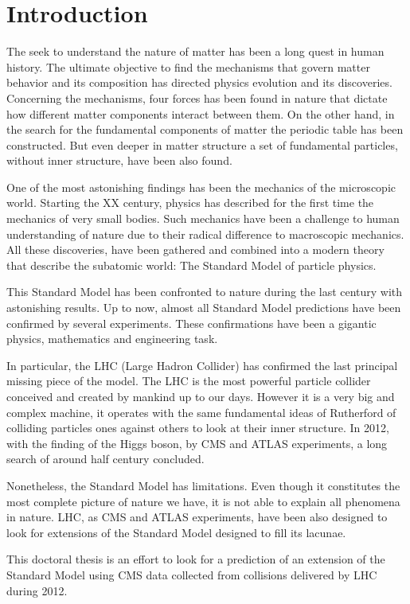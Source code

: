 \chapter*{Introduction}

The seek to understand the nature of matter has been a long quest in human history. The ultimate objective to find the mechanisms that govern matter behavior and its composition has directed physics evolution and its discoveries. Concerning the mechanisms, four forces has been found in nature that dictate how different matter components interact between them. On the other hand, in the search for the fundamental components of matter the periodic table has been constructed. But even deeper in matter structure a set of fundamental particles, without inner structure, have been also found. 

One of the most astonishing findings has been the mechanics of the microscopic world. Starting the XX century, physics has described for the first time the mechanics of very small bodies. Such mechanics have been a challenge to human understanding of nature due to their radical difference to macroscopic mechanics. All these discoveries, have been gathered and combined into a modern theory that describe the subatomic world: The Standard Model of particle physics. 

This Standard Model has been confronted to nature during the last century with astonishing results. Up to now, almost all Standard Model predictions have been confirmed by several experiments. These confirmations have been a gigantic physics, mathematics and engineering task.

In particular, the LHC (Large Hadron Collider) has confirmed the last principal missing piece of the model. The LHC is the most powerful particle collider conceived and created by mankind up to our days. However it is a very big and complex machine, it operates with the same fundamental ideas of Rutherford of colliding particles ones against others to look at their inner structure. In 2012, with the finding of the Higgs boson, by CMS and ATLAS experiments, a long search of around half century concluded.

Nonetheless, the Standard Model has limitations. Even though it constitutes the most complete picture of nature we have, it is not able to explain all phenomena in nature. LHC, as CMS and ATLAS experiments, have been also designed to look for extensions of the Standard Model designed to fill its lacunae. 

This doctoral thesis is an effort to look for a prediction of an extension of the Standard Model using CMS data collected from collisions delivered by LHC during 2012. 